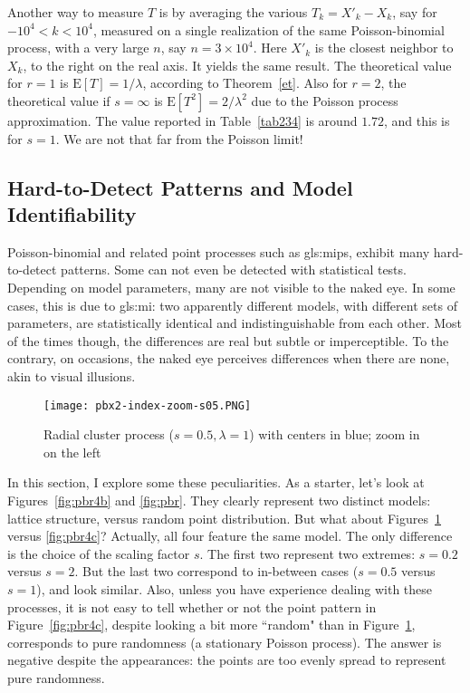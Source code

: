 \documentclass[10pt]{article}
\begin{document}
Another way to measure $T$ is by averaging the various $T_k=X'_k-X_k$, say for $-10^4 < k < 10^4$,  measured on a single realization of the same Poisson-binomial process, with a very large $n$, say $n=3\times 10^4$. Here $X'_k$ is the closest neighbor to $X_k$, to the right on the real axis. It yields the same result. The theoretical value for $r=1$ is $\mbox{E}[T]=1/\lambda$, according to Theorem~\ref{et}. Also for $r=2$, the theoretical value if $s=\infty$ is $\mbox{E}[T^2]=2/\lambda^2$ due to the Poisson process approximation. The value reported in Table~\ref{tab234} is around $1.72$, and this is for $s=1$. We are not that far from the Poisson limit!



\subsection{Hard-to-Detect Patterns and Model Identifiability}\label{hardid}

Poisson-binomial and related point processes such as \glspl{gls:mip}, exhibit many hard-to-detect patterns. Some can not even be detected with statistical tests. Depending on model parameters, many are not visible to the naked eye. In some cases, this is due to \gls{gls:mi}: two apparently different models, with different sets of parameters, are
statistically identical and indistinguishable from each other.  Most of the times though, the differences are real but subtle or imperceptible. To the contrary, on occasions, the naked eye perceives differences when there are none, akin to visual illusions.

\begin{figure}[H]
\centering
\texttt{[image: pbx2-index-zoom-s05.PNG]} %
\caption{Radial cluster process ($s=0.5, \lambda=1$) with centers in blue; zoom in on the left}
\label{fig:pbr4}
\end{figure}

In this section, I explore some these peculiarities. As a starter, let's look at Figures~\ref{fig:pbr4b} and \ref{fig:pbr}. They clearly represent two distinct models: lattice structure, versus random point distribution.  But what about
Figures~\ref{fig:pbr4} versus \ref{fig:pbr4c}? Actually, all four feature the same model. The only difference is the choice of the scaling factor $s$. The first two represent
 two extremes: $s=0.2$ versus $s=2$. But the last two correspond to in-between cases ($s=0.5$ versus $s=1$), and look similar. Also, unless you have experience dealing with these processes, it is not easy to tell whether or not the point pattern in Figure~\ref{fig:pbr4c}, despite looking a bit more ``random" than in Figure~\ref{fig:pbr4},  corresponds to pure randomness (a stationary Poisson process). The answer is negative despite the appearances: the points are too evenly spread to represent pure
 randomness.
\end{document}
